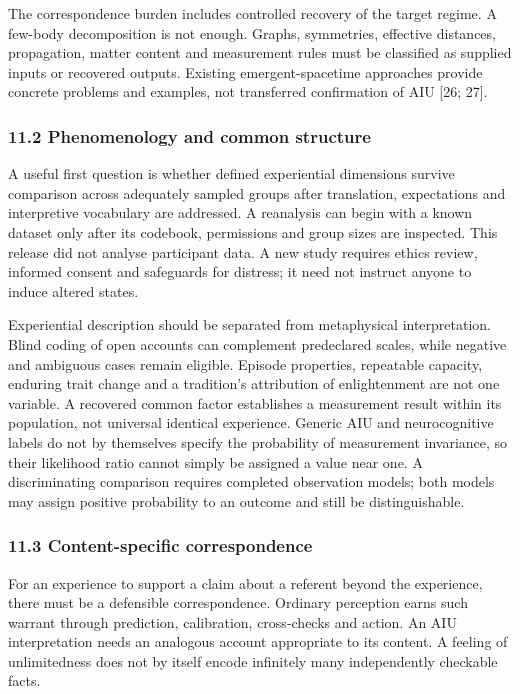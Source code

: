 \documentclass[
  10pt,
  a4paper,
]{article}
\begin{document}
The correspondence burden includes controlled recovery of the target
regime. A few-body decomposition is not enough. Graphs, symmetries,
effective distances, propagation, matter content and measurement rules
must be classified as supplied inputs or recovered outputs. Existing
emergent-spacetime approaches provide concrete problems and examples,
not transferred confirmation of AIU {[}26; 27{]}.

\subsubsection{11.2 Phenomenology and common
structure}\label{phenomenology-and-common-structure}

A useful first question is whether defined experiential dimensions
survive comparison across adequately sampled groups after translation,
expectations and interpretive vocabulary are addressed. A reanalysis can
begin with a known dataset only after its codebook, permissions and
group sizes are inspected. This release did not analyse participant
data. A new study requires ethics review, informed consent and
safeguards for distress; it need not instruct anyone to induce altered
states.

Experiential description should be separated from metaphysical
interpretation. Blind coding of open accounts can complement predeclared
scales, while negative and ambiguous cases remain eligible. Episode
properties, repeatable capacity, enduring trait change and a tradition's
attribution of enlightenment are not one variable. A recovered common
factor establishes a measurement result within its population, not
universal identical experience. Generic AIU and neurocognitive labels do
not by themselves specify the probability of measurement invariance, so
their likelihood ratio cannot simply be assigned a value near one. A
discriminating comparison requires completed observation models; both
models may assign positive probability to an outcome and still be
distinguishable.

\subsubsection{11.3 Content-specific
correspondence}\label{content-specific-correspondence}

For an experience to support a claim about a referent beyond the
experience, there must be a defensible correspondence. Ordinary
perception earns such warrant through prediction, calibration,
cross-checks and action. An AIU interpretation needs an analogous
account appropriate to its content. A feeling of unlimitedness does not
by itself encode infinitely many independently checkable facts.
\end{document}
